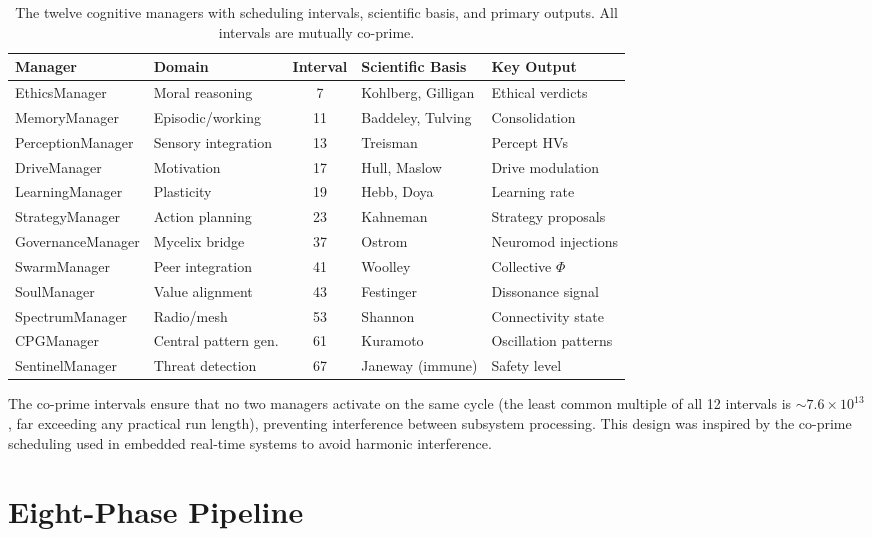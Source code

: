 \documentclass[12pt]{book}
\begin{document}
\begin{table}[H]
\centering
\caption{The twelve cognitive managers with scheduling intervals, scientific basis, and primary outputs. All intervals are mutually co-prime.}
\label{tab:managers}
\begin{tabular}{llcll}
\toprule
\textbf{Manager} & \textbf{Domain} & \textbf{Interval} & \textbf{Scientific Basis} & \textbf{Key Output} \\
\midrule
EthicsManager & Moral reasoning & 7 & Kohlberg, Gilligan & Ethical verdicts \\
MemoryManager & Episodic/working & 11 & Baddeley, Tulving & Consolidation \\
PerceptionManager & Sensory integration & 13 & Treisman & Percept HVs \\
DriveManager & Motivation & 17 & Hull, Maslow & Drive modulation \\
LearningManager & Plasticity & 19 & Hebb, Doya & Learning rate \\
StrategyManager & Action planning & 23 & Kahneman & Strategy proposals \\
GovernanceManager & Mycelix bridge & 37 & Ostrom & Neuromod injections \\
SwarmManager & Peer integration & 41 & Woolley & Collective $\Phi$ \\
SoulManager & Value alignment & 43 & Festinger & Dissonance signal \\
SpectrumManager & Radio/mesh & 53 & Shannon & Connectivity state \\
CPGManager & Central pattern gen. & 61 & Kuramoto & Oscillation patterns \\
SentinelManager & Threat detection & 67 & Janeway (immune) & Safety level \\
\bottomrule
\end{tabular}
\end{table}

The co-prime intervals ensure that no two managers activate on the same cycle (the least common multiple of all 12 intervals is $\sim 7.6 \times 10^{13}$, far exceeding any practical run length), preventing interference between subsystem processing. This design was inspired by the co-prime scheduling used in embedded real-time systems to avoid harmonic interference.

\section{Eight-Phase Pipeline}
\end{document}
